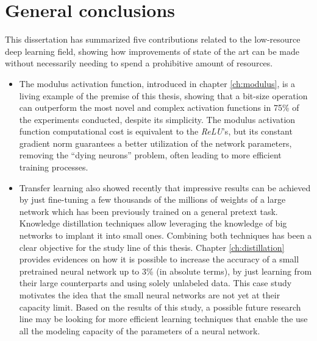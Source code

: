 \chapter{General conclusions} \label{ch:conclusions}
This dissertation has summarized five contributions related to the low-resource deep learning field, showing how improvements of state of the art can be made without necessarily needing to spend a prohibitive amount of resources. 

\begin{itemize}
\item The modulus activation function, introduced in chapter \ref{ch:modulus}, is a living example of the premise of this thesis, showing that a bit-size operation can outperform the most novel and complex activation functions in 75\% of the experiments conducted, despite its simplicity. The modulus activation function computational cost is equivalent to the \textit{ReLU}'s, but its constant gradient norm guarantees a better utilization of the network parameters, removing the ``dying neurons'' problem, often leading to more efficient training processes.

\item Transfer learning also showed recently that impressive results can be achieved by just fine-tuning a few thousands of the millions of weights of a large network which has been previously trained on a general pretext task. Knowledge distillation techniques allow leveraging the knowledge of big networks to implant it into small ones. Combining both techniques has been a clear objective for the study line of this thesis. Chapter \ref{ch:distillation} provides evidences on how it is possible to increase the accuracy of a small pretrained neural network up to 3\% (in absolute terms), by just learning from their large counterparts and using solely unlabeled data. This case study motivates the idea that the small neural networks are not yet at their capacity limit. Based on the results of this study, a possible future research line may be looking for more efficient learning techniques that enable the use all the modeling capacity of the parameters of a neural network.


\end{itemize}
